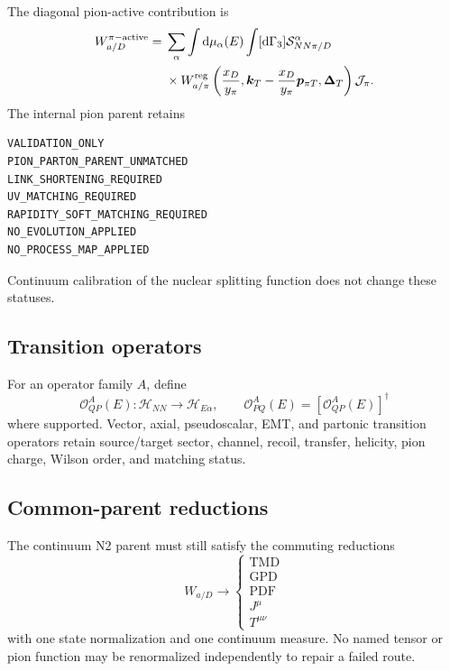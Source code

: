 \documentclass[11pt]{article}
\newcommand{\kT}{\bm{k}_{T}}
\newcommand{\DT}{\bm{\Delta}_{T}}
\newcommand{\dd}{\mathrm{d}}
\newcommand{\Hil}{\mathcal H}
\newcommand{\TMD}{\ensuremath{\mathrm{TMD}}}
\newcommand{\GPD}{\ensuremath{\mathrm{GPD}}}
\newcommand{\PDF}{\ensuremath{\mathrm{PDF}}}
\newcommand{\cO}{\mathcal O}
\newcommand{\cS}{\mathcal S}
\newcommand{\cJ}{\mathcal J}
\newcommand{\HNN}{\Hil_{NN}}
\begin{document}
The diagonal pion-active contribution is
\begin{align}
 W_{a/D}^{\pi\mathrm{-active}}
 ={}&
 \sum_{\alpha}
 \int\dd\mu_\alpha(E)
 \int[\dd\Gamma_3]
 \cS_{NN\pi/D}^{\alpha}
 \notag\\
 &\times
 W_{a/\pi}^{\mathrm{reg}}
 \left(
 \frac{x_D}{y_\pi},
 \kT-\frac{x_D}{y_\pi}\bm p_{\pi T},
 \DT
 \right)
 \cJ_\pi.
 \label{eq:pion-active-cont}
\end{align}
The internal pion parent retains
\begin{verbatim}
VALIDATION_ONLY
PION_PARTON_PARENT_UNMATCHED
LINK_SHORTENING_REQUIRED
UV_MATCHING_REQUIRED
RAPIDITY_SOFT_MATCHING_REQUIRED
NO_EVOLUTION_APPLIED
NO_PROCESS_MAP_APPLIED
\end{verbatim}
Continuum calibration of the nuclear splitting function does not change these
statuses.

\subsection{Transition operators}

For an operator family \(A\), define
\begin{equation}
 \cO^{A}_{QP}(E):\HNN\longrightarrow\Hil_{E\alpha},
 \qquad
 \cO^{A}_{PQ}(E)=\left[\cO^{A}_{QP}(E)\right]^{\dagger}
 \label{eq:transition-operator-cont}
\end{equation}
where supported.  Vector, axial, pseudoscalar, EMT, and partonic transition
operators retain source/target sector, channel, recoil, transfer, helicity,
pion charge, Wilson order, and matching status.

\subsection{Common-parent reductions}

The continuum N2 parent must still satisfy the commuting reductions
\begin{equation}
 W_{a/D}
 \longrightarrow
 \left\{
 \begin{array}{c}
 \TMD\\
 \GPD\\
 \PDF\\
 J^\mu\\
 T^{\mu\nu}
 \end{array}
 \right.
 \label{eq:n2-reductions}
\end{equation}
with one state normalization and one continuum measure.  No named tensor or
pion function may be renormalized independently to repair a failed route.
\end{document}
